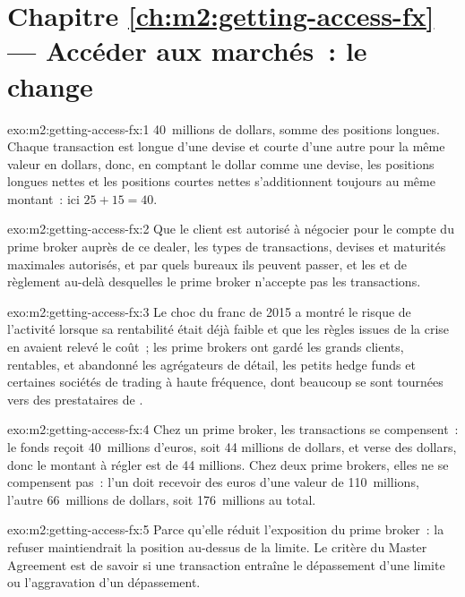 \section*{Chapitre \ref{ch:m2:getting-access-fx} --- Accéder aux marchés~: le change}

\begin{solution}{exo:m2:getting-access-fx:1}
40~millions de dollars, somme des positions longues. Chaque transaction est longue d'une devise et courte
d'une autre pour la même valeur en dollars, donc, en comptant le dollar comme une devise, les positions longues nettes
et les positions courtes nettes s'additionnent toujours au même montant~: ici $25 + 15 = 40$.
\end{solution}

\begin{solution}{exo:m2:getting-access-fx:2}
Que le client est autorisé à négocier pour le compte du prime broker auprès de ce dealer,
les types de transactions, devises et maturités maximales autorisés, et par quels bureaux ils peuvent passer,
et les  et de règlement au-delà desquelles le prime broker n'accepte pas
les transactions.
\end{solution}

\begin{solution}{exo:m2:getting-access-fx:3}
Le choc du franc de 2015 a montré le risque de l'activité lorsque sa rentabilité était
déjà faible et que les règles issues de la crise en avaient relevé le coût~; les prime brokers ont gardé les grands clients,
rentables, et abandonné les agrégateurs de détail, les petits hedge funds et certaines
sociétés de trading à haute fréquence, dont beaucoup se sont tournées vers des prestataires de .
\end{solution}

\begin{solution}{exo:m2:getting-access-fx:4}
Chez un prime broker, les transactions se compensent~: le fonds reçoit 40~millions d'euros, soit 44
millions de dollars, et verse des dollars, donc le montant à régler est de 44 millions. Chez deux prime brokers, elles
ne se compensent pas~: l'un doit recevoir des euros d'une valeur de 110~millions, l'autre 66~millions de dollars,
soit 176~millions au total.
\end{solution}

\begin{solution}{exo:m2:getting-access-fx:5}
Parce qu'elle réduit l'exposition du prime broker~: la refuser maintiendrait la position au-dessus
de la limite. Le critère du Master Agreement est de savoir si une transaction entraîne le dépassement d'une limite
ou l'aggravation d'un dépassement.
\end{solution}

